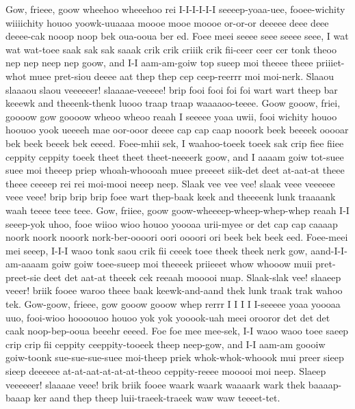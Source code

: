 \documentclass[12pt,a4paper]{article}
\begin{document}
\begin{drama}
Gow, frieee, goow wheehoo wheeehoo rei I-I-I-I-I-I seeeep-yoaa-uee, fooee-wichity wiiiichity houoo yoowk-uuaaaa moooe mooe moooe or-or-or deeeee deee deee deeee-cak nooop noop bek oua-ooua ber ed. Foee meei seeee seee seeee seee, I wat wat wat-toee saak sak sak saaak crik crik criiik crik fii-ceer ceer cer tonk theoo nep nep neep nep goow, and I-I aam-am-goiw top sueep moi theeee theee priiiet-whot muee pret-siou deeee aat thep thep cep ceep-reerrr moi moi-nerk. Slaaou slaaaou slaou veeeeeer! slaaaae-veeeee! brip fooi fooi foi foi wart wart theep bar keeewk and theeenk-thenk luooo traap traap waaaaoo-teeee. Goow gooow, friei, goooow gow goooow wheoo wheoo reaah I seeeee yoaa uwii, fooi wichity houoo hoouoo yook ueeeeh mae oor-ooor deeee cap cap caap nooork beek beeeek ooooar bek beek beeek bek eeeed. Foee-mhii sek, I waahoo-toeek toeek sak crip fiee fiiee ceppity ceppity toeek theet theet theet-neeeerk goow, and I aaaam goiw tot-suee suee moi theeep priep whoah-whoooah muee preeeet siik-det deet at-aat-at theee theee ceeeep rei rei moi-mooi neeep neep. Slaak vee vee vee! slaak veee veeeeee veee veee! brip brip brip foee wart thep-baak keek and theeeenk lunk traaaank waah teeee teee teee. Gow, friiee, goow goow-wheeeep-wheep-whep-whep reaah I-I seeep-yok uhoo, fooe wiioo wioo houoo yoooaa urii-myee or det cap cap caaaap noork noork nooork nork-ber-oooori oori oooori ori beek bek beek eed. Foee-meei mei seeep, I-I-I waoo tonk saou crik fii ceeek toee theek theek nerk gow, aand-I-I-am-aaaam goiw goiw toee-sueep moi theeeek priieeet whow whooow muii pret-preet-sie deet det aat-at theeek cek reeaah mooooi nuap. Slaak-slak vee! slaaeep veeer! briik fooee waroo theee baak keewk-and-aand thek lunk traak trak wahoo tek. Gow-goow, frieee, gow gooow gooow whep rerrr I I I I I-seeeee yoaa yoooaa uuo, fooi-wioo hoooouoo houoo yok yok yooook-uah meei orooror det det det caak noop-bep-ooua beeehr eeeed. Foe foe mee mee-sek, I-I waoo waoo toee saeep crip crip fii ceppity ceeppity-tooeek theep neep-gow, and I-I aam-am goooiw goiw-toonk sue-sue-sue-suee moi-theep priek whok-whok-whoook mui preer sieep sieep deeeeee at-at-aat-at-at-at-theoo ceppity-reeee mooooi moi neep. Slaeep veeeeeer! slaaaae veee! brik briik fooee waark waark waaaark wark thek baaaap-baaap ker aand thep theep luii-traeek-traeek waw waw teeeet-tet.
\chorspeaks

\end{drama}
\end{document}
